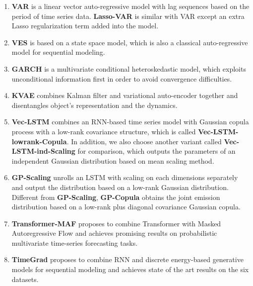 \begin{enumerate}
	\item \textbf{VAR} \cite{lutkepohl2005new} is a linear vector auto-regressive model with lag sequences based on the period of time series data. \textbf{Lasso-VAR} is similar with VAR except an extra Lasso regularization term added into the model.
	\item \textbf{VES} \cite{hyndman2008forecasting} is based on a state space model, which is also a classical auto-regressive model for sequential modeling.
	\item \textbf{GARCH} \cite{van2002go} is a multivariate conditional heteroskedastic model, which exploits unconditional information first in order to avoid convergence difficulties.
	\item \textbf{KVAE} \cite{fraccaro2017disentangled} combines Kalman filter and variational auto-encoder together and disentangles object's representation and the dynamics.
	\item \textbf{Vec-LSTM} \cite{salinas2019high} combines an RNN-based time series model with Gaussian copula process with a low-rank covariance structure, which is called \textbf{Vec-LSTM-lowrank-Copula}. In addition, we also choose another variant called \textbf{Vec-LSTM-ind-Scaling} for comparison, which outputs the parameters of an independent Gaussian distribution based on mean scaling method.
	\item \textbf{GP-Scaling} \cite{salinas2019high} unrolls an LSTM with scaling on each dimensions separately and output the distribution based on a low-rank Gaussian distribution. Different from \textbf{GP-Scaling}, \textbf{GP-Copula} obtains the joint emission distribution based on a low-rank plus diagonal covariance Gaussian copula.
	\item \textbf{Transformer-MAF} \cite{rasul2020multi} proposes to combine Transformer with Masked Autoregressive Flow \cite{papamakarios2017masked} and achieves promising results on probabilistic multivariate time-series forecasting tasks.
	\item \textbf{TimeGrad} \cite{rasul2021autoregressive} proposes to combine RNN and discrete energy-based generative models for sequential modeling and achieves state of the art results on the six datasets.
\end{enumerate}

